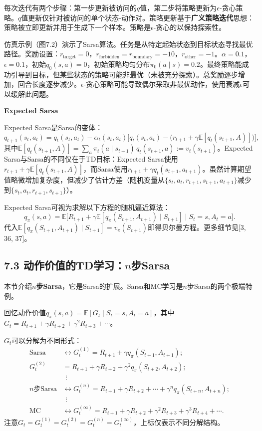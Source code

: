 \documentclass[UTF8]{article}
\begin{document}
每次迭代有两个步骤：第一步更新被访问的$q$值，第二步将策略更新为$\epsilon$-贪心策略。$q$值更新仅针对被访问的单个状态-动作对。策略更新基于\textbf{广义策略迭代}思想：策略被立即更新并用于生成下一个样本。策略是$\epsilon$-贪心的以保持探索性。

仿真示例（图7.2）演示了Sarsa算法。任务是从特定起始状态到目标状态寻找最优路径。奖励设置：$r_{\text{target}} = 0$，$r_{\text{forbidden}} = r_{\text{boundary}} = -10$，$r_{\text{other}} = -1$。$\alpha = 0.1$，$\epsilon = 0.1$，初始$q_0(s, a) = 0$，初始策略均匀分布$\pi_0(a \mid s) = 0.2$。最终策略能成功引导到目标，但某些状态的策略可能非最优（未被充分探索）。总奖励逐步增加，回合长度逐步减少。$\epsilon$-贪心策略可能导致偶尔采取非最优动作，使用衰减$\epsilon$可以缓解此问题。

\begin{proofbox}
\textbf{Expected Sarsa}

Expected Sarsa是Sarsa的变体：
\[
q_{t+1}(s_t, a_t) = q_t(s_t, a_t) - \alpha_t(s_t, a_t)\Big[q_t(s_t, a_t) - \big(r_{t+1} + \gamma \mathbb{E}[q_t(s_{t+1}, A)]\big)\Big],
\]
其中$\mathbb{E}[q_t(s_{t+1}, A)] = \sum_a \pi_t(a \mid s_{t+1})\,q_t(s_{t+1}, a) := v_t(s_{t+1})$。Expected Sarsa与Sarsa的不同仅在于TD目标：Expected Sarsa使用$r_{t+1} + \gamma \mathbb{E}[q_t(s_{t+1}, A)]$，而Sarsa使用$r_{t+1} + \gamma q_t(s_{t+1}, a_{t+1})$。虽然计算期望值略微增加复杂度，但减少了估计方差（随机变量从$\{s_t, a_t, r_{t+1}, s_{t+1}, a_{t+1}\}$减少到$\{s_t, a_t, r_{t+1}, s_{t+1}\}$）。

Expected Sarsa可视为求解以下方程的随机逼近算法：
\[
q_\pi(s, a) = \mathbb{E}\Big[R_{t+1} + \gamma \mathbb{E}[q_\pi(S_{t+1}, A_{t+1}) \mid S_{t+1}] \;\Big|\; S_t = s, A_t = a\Big].
\]
代入$\mathbb{E}[q_\pi(S_{t+1}, A_{t+1}) \mid S_{t+1}] = v_\pi(S_{t+1})$即得贝尔曼方程。更多细节见[3, 36, 37]。
\end{proofbox}

\subsection*{7.3 动作价值的TD学习：$n$步Sarsa}

本节介绍\textbf{$n$步Sarsa}，它是Sarsa的扩展。Sarsa和MC学习是$n$步Sarsa的两个极端特例。

回忆动作价值$q_\pi(s, a) = \mathbb{E}[G_t \mid S_t = s, A_t = a]$，其中$G_t = R_{t+1} + \gamma R_{t+2} + \gamma^2 R_{t+3} + \cdots$。

$G_t$可以分解为不同形式：
\begin{align*}
\text{Sarsa} &\longleftrightarrow G_t^{(1)} = R_{t+1} + \gamma q_\pi(S_{t+1}, A_{t+1}); \\
G_t^{(2)} &= R_{t+1} + \gamma R_{t+2} + \gamma^2 q_\pi(S_{t+2}, A_{t+2}); \\
&\ \ \vdots \\
\text{$n$步Sarsa} &\longleftrightarrow G_t^{(n)} = R_{t+1} + \gamma R_{t+2} + \cdots + \gamma^n q_\pi(S_{t+n}, A_{t+n}); \\
&\ \ \vdots \\
\text{MC} &\longleftrightarrow G_t^{(\infty)} = R_{t+1} + \gamma R_{t+2} + \gamma^2 R_{t+3} + \gamma^3 R_{t+4} + \cdots.
\end{align*}
注意$G_t = G_t^{(1)} = G_t^{(2)} = G_t^{(n)} = G_t^{(\infty)}$，上标仅表示不同分解结构。
\end{document}
